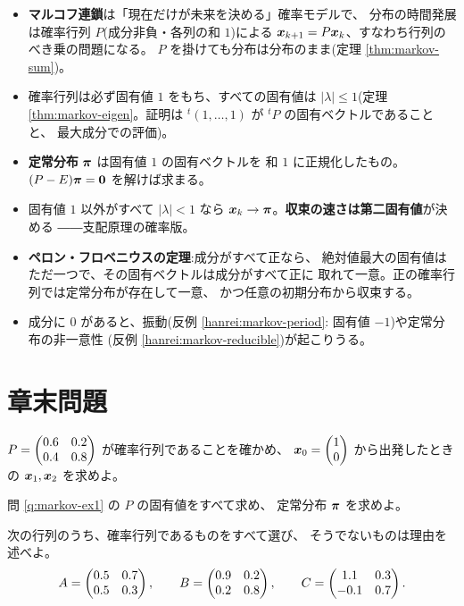 \begin{matome}
\begin{itemize}
\item \textbf{マルコフ連鎖}は「現在だけが未来を決める」確率モデルで、
分布の時間発展は確率行列 $P$(成分非負・各列の和 $1$)による
$\bm{x}_{k+1} = P\bm{x}_k$、すなわち行列のべき乗の問題になる。
$P$ を掛けても分布は分布のまま(定理 \ref{thm:markov-sum})。
\item 確率行列は必ず固有値 $1$ をもち、すべての固有値は
$|\lambda| \le 1$(定理 \ref{thm:markov-eigen}。証明は
${}^t(1, \dots, 1)$ が ${}^tP$ の固有ベクトルであることと、
最大成分での評価)。
\item \textbf{定常分布} $\bm{\pi}$ は固有値 $1$ の固有ベクトルを
和 $1$ に正規化したもの。$(P - E)\bm{\pi} = \bm{0}$ を解けば求まる。
\item 固有値 $1$ 以外がすべて $|\lambda| < 1$ なら
$\bm{x}_k \to \bm{\pi}$。\textbf{収束の速さは第二固有値}が決める
――支配原理の確率版。
\item \textbf{ペロン・フロベニウスの定理}:成分がすべて正なら、
絶対値最大の固有値はただ一つで、その固有ベクトルは成分がすべて正に
取れて一意。正の確率行列では定常分布が存在して一意、
かつ任意の初期分布から収束する。
\item 成分に $0$ があると、振動(反例 \ref{hanrei:markov-period}:
固有値 $-1$)や定常分布の非一意性
(反例 \ref{hanrei:markov-reducible})が起こりうる。
\end{itemize}
\end{matome}

\section*{章末問題}

\begin{mondai}[基本]\label{q:markov-ex1}
$P = \begin{pmatrix}0.6 & 0.2 \\ 0.4 & 0.8\end{pmatrix}$ が確率行列であることを確かめ、
$\bm{x}_0 = \begin{pmatrix}1 \\ 0\end{pmatrix}$ から出発したときの
$\bm{x}_1, \bm{x}_2$ を求めよ。
\end{mondai}

\begin{mondai}[基本]\label{q:markov-ex2}
問 \ref{q:markov-ex1} の $P$ の固有値をすべて求め、
定常分布 $\bm{\pi}$ を求めよ。
\end{mondai}

\begin{mondai}[基本]\label{q:markov-ex3}
次の行列のうち、確率行列であるものをすべて選び、
そうでないものは理由を述べよ。
\[
A = \begin{pmatrix}0.5 & 0.7 \\ 0.5 & 0.3\end{pmatrix}, \qquad
B = \begin{pmatrix}0.9 & 0.2 \\ 0.2 & 0.8\end{pmatrix}, \qquad
C = \begin{pmatrix}1.1 & 0.3 \\ -0.1 & 0.7\end{pmatrix}.
\]
\end{mondai}

